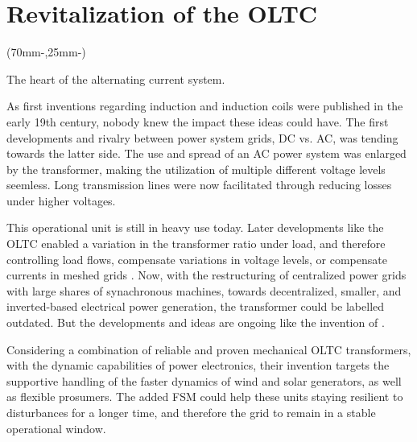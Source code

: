 \begingroup
\chapter{Revitalization of the OLTC} %
\label{chap:intro}

\begin{textblock*}{.7\textwidth}(70mm-\offset,25mm-\offset)%
    \begin{fquote}
        The heart of the alternating current system.
    \end{fquote}
\end{textblock*}

\endgroup

As first inventions regarding induction and induction coils were published in the early 19th century, nobody knew the impact these ideas could have.
The first developments and rivalry between power system grids, \acf{DC} vs. \acf{AC}, was tending towards the latter side.
The use and spread of an \acs{AC} power system was enlarged by the transformer, making the utilization of multiple different voltage levels seemless.
Long transmission lines were now facilitated through reducing losses under higher voltages. \autocite{hughes_1993,hurley_2014}

This operational unit is still in heavy use today.
Later developments like the \acf{OLTC} enabled a variation in the transformer ratio under load, and therefore controlling load flows, compensate variations in voltage levels, or compensate currents in meshed grids \autocite{schwab_2022}.
Now, with the restructuring of centralized power grids with large shares of synachronous machines, towards decentralized, smaller, and inverted-based electrical power generation, the transformer could be labelled outdated.
But the developments and ideas are ongoing like the invention of \textcite{maschinenfabrikreinhausengmbh_2023}.

Considering a combination of reliable and proven mechanical \acs{OLTC} transformers, with the dynamic capabilities of power electronics, their invention targets the supportive handling of the faster dynamics of wind and solar generators, as well as flexible prosumers.
The added \acf{FSM} could help these units staying resilient to disturbances for a longer time, and therefore the grid to remain in a stable operational window. 


